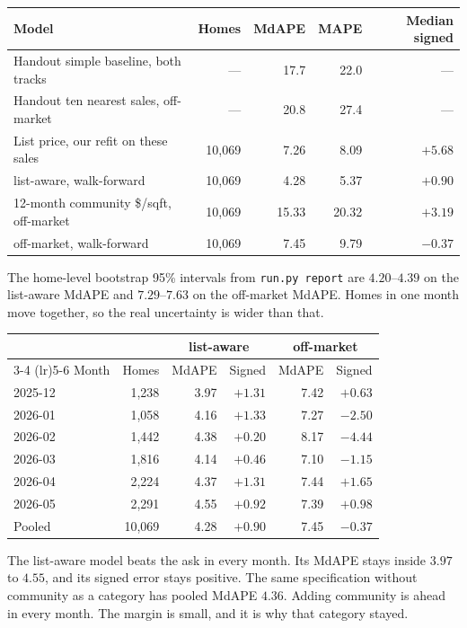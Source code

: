 \documentclass[11pt]{article}
\newcommand{\la}{list-aware}
\newcommand{\om}{off-market}
\begin{document}
\begin{center}
\small
\begin{tabular}{lrrrr}
\toprule
Model & Homes & MdAPE & MAPE & Median signed \\
\midrule
Handout simple baseline, both tracks & --- & 17.7 & 22.0 & --- \\
Handout ten nearest sales, off-market & --- & 20.8 & 27.4 & --- \\
List price, our refit on these sales & 10{,}069 & 7.26 & 8.09 & \(+5.68\) \\
\la, walk-forward & 10{,}069 & 4.28 & 5.37 & \(+0.90\) \\
12-month community \$/sqft, off-market & 10{,}069 & 15.33 & 20.32 & \(+3.19\) \\
\om, walk-forward & 10{,}069 & 7.45 & 9.79 & \(-0.37\) \\
\bottomrule
\end{tabular}
\end{center}

The home-level bootstrap 95\% intervals from \texttt{run.py report} are \(4.20\)--\(4.39\) on the list-aware MdAPE and \(7.29\)--\(7.63\) on the off-market MdAPE. Homes in one month move together, so the real uncertainty is wider than that.

\begin{center}
\small
\begin{tabular}{l r rr rr}
\toprule
 & & \multicolumn{2}{c}{\la} & \multicolumn{2}{c}{\om} \\
\cmidrule(lr){3-4} \cmidrule(lr){5-6}
Month & Homes & MdAPE & Signed & MdAPE & Signed \\
\midrule
2025-12 & 1{,}238 & 3.97 & \(+1.31\) & 7.42 & \(+0.63\) \\
2026-01 & 1{,}058 & 4.16 & \(+1.33\) & 7.27 & \(-2.50\) \\
2026-02 & 1{,}442 & 4.38 & \(+0.20\) & 8.17 & \(-4.44\) \\
2026-03 & 1{,}816 & 4.14 & \(+0.46\) & 7.10 & \(-1.15\) \\
2026-04 & 2{,}224 & 4.37 & \(+1.31\) & 7.44 & \(+1.65\) \\
2026-05 & 2{,}291 & 4.55 & \(+0.92\) & 7.39 & \(+0.98\) \\
\midrule
Pooled & 10{,}069 & 4.28 & \(+0.90\) & 7.45 & \(-0.37\) \\
\bottomrule
\end{tabular}
\end{center}

The list-aware model beats the ask in every month. Its MdAPE stays inside \(3.97\) to \(4.55\), and its signed error stays positive. The same specification without community as a category has pooled MdAPE \(4.36\). Adding community is ahead in every month. The margin is small, and it is why that category stayed.
\end{document}
